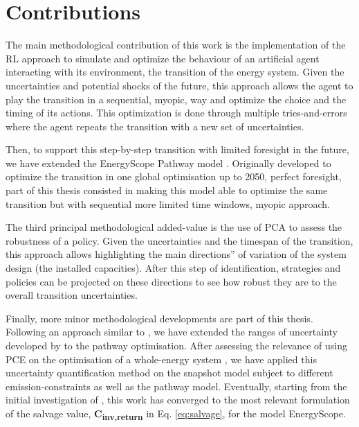 \section*{Contributions}
\label{sec:meth:contributions}
The main methodological contribution of this work is the implementation of the \gls{RL} approach to simulate and optimize the behaviour of an artificial agent interacting with its environment, \ie the transition of the energy system. Given the uncertainties and potential shocks of the future, this approach allows the agent to play the transition in a sequential, \ie myopic, way and optimize the choice and the timing of its actions. This optimization is done through multiple tries-and-errors where the agent repeats the transition with a new set of uncertainties. 

Then, to support this step-by-step transition with limited foresight in the future, we have extended the EnergyScope Pathway model \cite{limpens2021generating}. Originally developed to optimize the transition in one global optimisation up to 2050, \ie perfect foresight, part of this thesis consisted in making this model able to optimize the same transition but with sequential more limited time windows, \ie myopic approach.

The third principal methodological added-value is the use of \acrfull{PCA} to assess the robustness of a policy. Given the uncertainties and the timespan of the transition, this approach allows highlighting the main \og directions'' of variation of the system design (\ie the installed capacities). After this step of identification, strategies and policies can be projected on these directions to see how robust they are to the overall transition uncertainties.

Finally, more minor methodological developments are part of this thesis. Following an approach similar to \citet{guevara2022modeling}, we have extended the ranges of uncertainty developed by \citet{Moret2017} to the pathway optimisation. After assessing the relevance of using \acrfull{PCE} on the optimisation of a whole-energy system \cite{limpens2020impact}, we have applied this uncertainty quantification method on the snapshot model subject to different emission-constraints \citet{rixhon2021role} as well as the pathway model. Eventually, starting from the initial investigation of \citet{goffauxpathway}, this work has converged to the most relevant formulation of the salvage value, \ie \textbf{C\textsubscript{inv,return}} in Eq. \ref{eq:salvage}, for the model EnergyScope.

